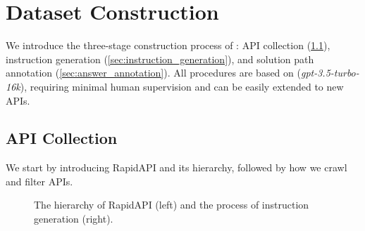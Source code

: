 \section{Dataset Construction}
We introduce the three-stage construction process of \ourdata: API collection (\cref{sec:api_collection}), instruction generation (\cref{sec:instruction_generation}), and solution path annotation (\cref{sec:answer_annotation}). All procedures are based on \turbo (\textit{gpt-3.5-turbo-16k}), requiring minimal human supervision and can be easily extended to new APIs. 

\subsection{API Collection}
\label{sec:api_collection}
We start by introducing RapidAPI and its hierarchy, followed by how we crawl and filter APIs.

\begin{figure}[!t]
    \centering
    \caption{
    \small{The hierarchy of RapidAPI (left) and the process of instruction generation (right).}
    }
    \label{fig:phase12}
\end{figure}

